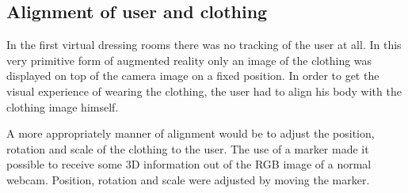 \documentclass[twocolumn,a4paper]{article}
\begin{document}
\subsection{Alignment of user and clothing}

In the first virtual dressing rooms there was no tracking of the user at all. In this very primitive form of augmented reality only an image of the clothing was displayed on top of the camera image on a fixed position. In order to get the visual experience of wearing the clothing, the user had to align his body with the clothing image himself. 

A more appropriately manner of alignment would be to adjust the position, rotation and scale of the clothing to the user. The use of a marker made it possible to receive some 3D information out of the RGB image of a normal webcam. Position, rotation and scale were adjusted by moving the marker.
\end{document}
